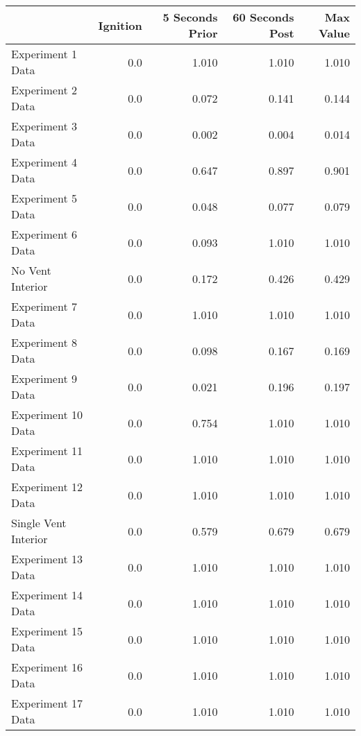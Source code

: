 \begin{tabular}{lrrrr}
\toprule
{} &  Ignition &  5 Seconds Prior &  60 Seconds Post &  Max Value \\
\midrule
Experiment 1 Data    &       0.0 &            1.010 &            1.010 &      1.010 \\
Experiment 2 Data    &       0.0 &            0.072 &            0.141 &      0.144 \\
Experiment 3 Data    &       0.0 &            0.002 &            0.004 &      0.014 \\
Experiment 4 Data    &       0.0 &            0.647 &            0.897 &      0.901 \\
Experiment 5 Data    &       0.0 &            0.048 &            0.077 &      0.079 \\
Experiment 6 Data    &       0.0 &            0.093 &            1.010 &      1.010 \\
No Vent Interior     &       0.0 &            0.172 &            0.426 &      0.429 \\
Experiment 7 Data    &       0.0 &            1.010 &            1.010 &      1.010 \\
Experiment 8 Data    &       0.0 &            0.098 &            0.167 &      0.169 \\
Experiment 9 Data    &       0.0 &            0.021 &            0.196 &      0.197 \\
Experiment 10 Data   &       0.0 &            0.754 &            1.010 &      1.010 \\
Experiment 11 Data   &       0.0 &            1.010 &            1.010 &      1.010 \\
Experiment 12 Data   &       0.0 &            1.010 &            1.010 &      1.010 \\
Single Vent Interior &       0.0 &            0.579 &            0.679 &      0.679 \\
Experiment 13 Data   &       0.0 &            1.010 &            1.010 &      1.010 \\
Experiment 14 Data   &       0.0 &            1.010 &            1.010 &      1.010 \\
Experiment 15 Data   &       0.0 &            1.010 &            1.010 &      1.010 \\
Experiment 16 Data   &       0.0 &            1.010 &            1.010 &      1.010 \\
Experiment 17 Data   &       0.0 &            1.010 &            1.010 &      1.010 \\

\end{tabular}
